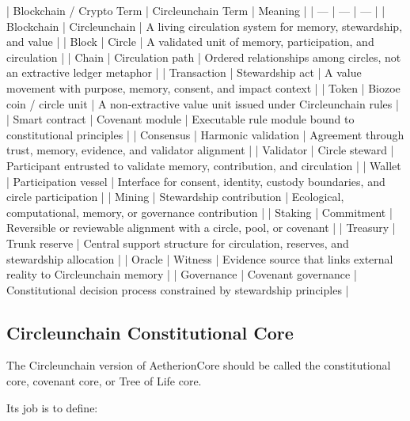 ﻿\documentclass[12pt]{article}
\begin{document}
| Blockchain / Crypto Term | Circleunchain Term | Meaning |
| --- | --- | --- |
| Blockchain | Circleunchain | A living circulation system for memory, stewardship, and value |
| Block | Circle | A validated unit of memory, participation, and circulation |
| Chain | Circulation path | Ordered relationships among circles, not an extractive ledger metaphor |
| Transaction | Stewardship act | A value movement with purpose, memory, consent, and impact context |
| Token | Biozoe coin / circle unit | A non-extractive value unit issued under Circleunchain rules |
| Smart contract | Covenant module | Executable rule module bound to constitutional principles |
| Consensus | Harmonic validation | Agreement through trust, memory, evidence, and validator alignment |
| Validator | Circle steward | Participant entrusted to validate memory, contribution, and circulation |
| Wallet | Participation vessel | Interface for consent, identity, custody boundaries, and circle participation |
| Mining | Stewardship contribution | Ecological, computational, memory, or governance contribution |
| Staking | Commitment | Reversible or reviewable alignment with a circle, pool, or covenant |
| Treasury | Trunk reserve | Central support structure for circulation, reserves, and stewardship allocation |
| Oracle | Witness | Evidence source that links external reality to Circleunchain memory |
| Governance | Covenant governance | Constitutional decision process constrained by stewardship principles |

\subsection{Circleunchain Constitutional Core}


The Circleunchain version of AetherionCore should be called the constitutional core, covenant core, or Tree of Life core.

Its job is to define:
\end{document}
